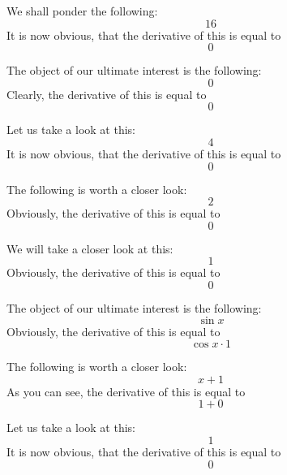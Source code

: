 \documentclass{article}
\begin{document}
We shall ponder the following:
\begin{equation}
16 
\end{equation}
It is now obvious, that the derivative of this is equal to
\begin{equation}
0 
\end{equation}

The object of our ultimate interest is the following:
\begin{equation}
0 
\end{equation}
Clearly, the derivative of this is equal to
\begin{equation}
0 
\end{equation}

Let us take a look at this:
\begin{equation}
4 
\end{equation}
It is now obvious, that the derivative of this is equal to
\begin{equation}
0 
\end{equation}

The following is worth a closer look:
\begin{equation}
2 
\end{equation}
Obviously, the derivative of this is equal to
\begin{equation}
0 
\end{equation}

We will take a closer look at this:
\begin{equation}
1 
\end{equation}
Obviously, the derivative of this is equal to
\begin{equation}
0 
\end{equation}

The object of our ultimate interest is the following:
\begin{equation}
\sin x 
\end{equation}
Obviously, the derivative of this is equal to
\begin{equation}
\cos x \cdot 1 
\end{equation}

The following is worth a closer look:
\begin{equation}
x + 1 
\end{equation}
As you can see, the derivative of this is equal to
\begin{equation}
1 + 0 
\end{equation}

Let us take a look at this:
\begin{equation}
1 
\end{equation}
It is now obvious, that the derivative of this is equal to
\begin{equation}
0 
\end{equation}
\end{document}

